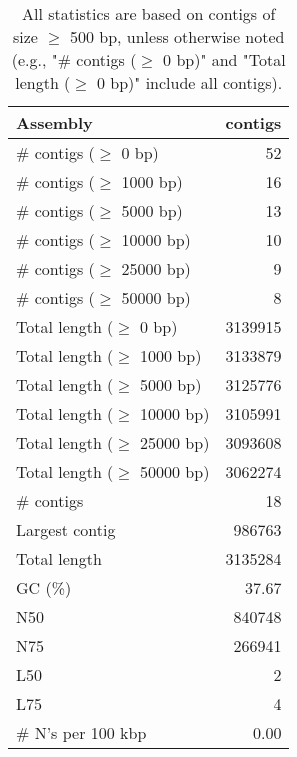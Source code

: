 \documentclass[12pt,a4paper]{article}
\begin{document}
\begin{table}[ht]
\begin{center}
\caption{All statistics are based on contigs of size $\geq$ 500 bp, unless otherwise noted (e.g., "\# contigs ($\geq$ 0 bp)" and "Total length ($\geq$ 0 bp)" include all contigs).}
\begin{tabular}{|l*{1}{|r}|}
\hline
Assembly & contigs \\ \hline
\# contigs ($\geq$ 0 bp) & 52 \\ \hline
\# contigs ($\geq$ 1000 bp) & 16 \\ \hline
\# contigs ($\geq$ 5000 bp) & 13 \\ \hline
\# contigs ($\geq$ 10000 bp) & 10 \\ \hline
\# contigs ($\geq$ 25000 bp) & 9 \\ \hline
\# contigs ($\geq$ 50000 bp) & 8 \\ \hline
Total length ($\geq$ 0 bp) & 3139915 \\ \hline
Total length ($\geq$ 1000 bp) & 3133879 \\ \hline
Total length ($\geq$ 5000 bp) & 3125776 \\ \hline
Total length ($\geq$ 10000 bp) & 3105991 \\ \hline
Total length ($\geq$ 25000 bp) & 3093608 \\ \hline
Total length ($\geq$ 50000 bp) & 3062274 \\ \hline
\# contigs & 18 \\ \hline
Largest contig & 986763 \\ \hline
Total length & 3135284 \\ \hline
GC (\%) & 37.67 \\ \hline
N50 & 840748 \\ \hline
N75 & 266941 \\ \hline
L50 & 2 \\ \hline
L75 & 4 \\ \hline
\# N's per 100 kbp & 0.00 \\ \hline
\end{tabular}
\end{center}
\end{table}
\end{document}
